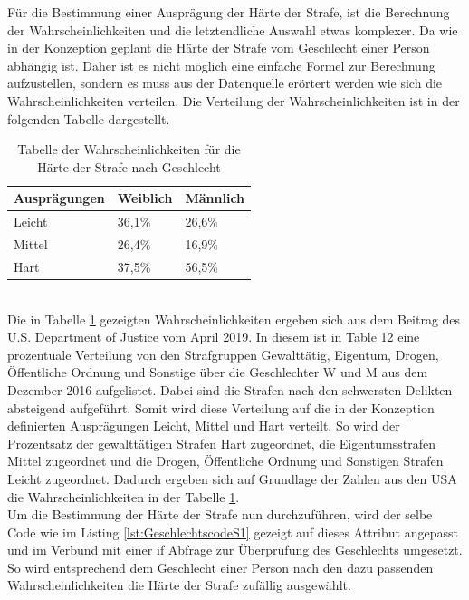 \begin{onehalfspace}
Für die Bestimmung einer Ausprägung der Härte der Strafe, ist die Berechnung der Wahrscheinlichkeiten und die letztendliche Auswahl etwas komplexer. Da wie in der Konzeption geplant die Härte der Strafe vom Geschlecht einer Person abhängig ist. Daher ist es nicht möglich eine einfache Formel zur Berechnung aufzustellen, sondern es muss aus der Datenquelle erörtert werden wie sich die Wahrscheinlichkeiten verteilen. Die Verteilung der Wahrscheinlichkeiten ist in der folgenden Tabelle dargestellt.\\
\begin{table}[h]
    \centering
    \begin{tabular}{|l|l|l|}
    \hline
    \textbf{Ausprägungen} & \textbf{Weiblich} & \textbf{Männlich} \\ \hline
    Leicht                & 36,1\%            & 26,6\%            \\ \hline
    Mittel                & 26,4\%            & 16,9\%            \\ \hline
    Hart                  & 37,5\%            & 56,5\%            \\ \hline
    \end{tabular}
\caption{Tabelle der Wahrscheinlichkeiten für die Härte der Strafe nach Geschlecht}
\label{table:4}
\end{table}\\
Die in Tabelle \ref{table:4} gezeigten Wahrscheinlichkeiten ergeben sich aus dem Beitrag des U.S. Department of Justice vom April 2019. In diesem ist in \glqq{}Table 12\grqq{} eine prozentuale Verteilung von den Strafgruppen Gewalttätig, Eigentum, Drogen, Öffentliche Ordnung und Sonstige über die Geschlechter \ac{W} und \ac{M} aus dem Dezember 2016 aufgelistet. Dabei sind die Strafen nach den schwersten Delikten absteigend aufgeführt. Somit wird diese Verteilung auf die in der Konzeption definierten Ausprägungen Leicht, Mittel und Hart verteilt. So wird der Prozentsatz der gewalttätigen Strafen Hart zugeordnet, die Eigentumsstrafen Mittel zugeordnet und die Drogen, Öffentliche Ordnung und Sonstigen Strafen Leicht zugeordnet. Dadurch ergeben sich auf Grundlage der Zahlen aus den USA die Wahrscheinlichkeiten in der Tabelle \ref{table:4}.\cite[S. 21]{Bronson2017}\\
Um die Bestimmung der Härte der Strafe nun durchzuführen, wird der selbe Code wie im Listing \ref{lst:GeschlechtscodeS1} gezeigt auf dieses Attribut angepasst und im Verbund mit einer if Abfrage zur Überprüfung des Geschlechts umgesetzt. So wird entsprechend dem Geschlecht einer Person nach den dazu passenden Wahrscheinlichkeiten die Härte der Strafe zufällig ausgewählt.\\

\end{onehalfspace}
